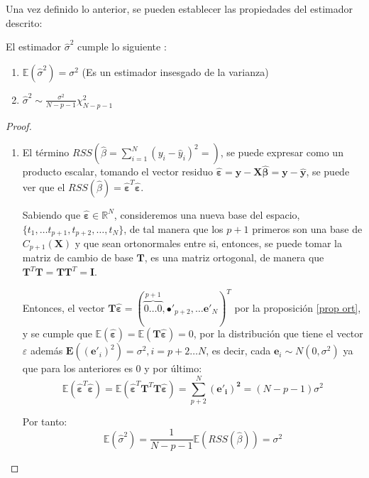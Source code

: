 \noindent Una vez definido lo anterior, se pueden establecer las propiedades del estimador descrito:
\begin{propo}
El estimador $\hat{\sigma}^2$ cumple lo siguiente :
\begin{enumerate}
\item $\mathbb{E}(\hat{\sigma} ^2)=\sigma^2$ (Es un estimador insesgado de la varianza)
\item  $\hat{\sigma}^2 \sim \frac{\sigma^2}{N-p-1}\chi_{N-p-1}^2 $
\end{enumerate}
\begin{proof}
\noindent 
\begin{enumerate}
\item El término $RSS(\hat{\beta}=\sum_{i=1}^N (y_i-\hat{y}_i)^2=)$, se puede expresar como un producto escalar, tomando el vector residuo $\hat{\mathbf{\varepsilon}}= \mathbf{y}-\mathbf{X \hat{\beta}}=\mathbf{y}-\mathbf{\hat{y}}$, se puede ver que el $RSS(\hat{\beta})=\hat{\mathbf{\varepsilon}}^T\hat{\mathbf{\varepsilon}}$. 

\noindent Sabiendo que $\mathbf{\hat{\varepsilon}}\in \mathbb{R}^N$, consideremos una nueva base del espacio,\\ $\lbrace t_1,\ldots t_{p+1},t_{p+2},\ldots, t_N \rbrace$, de tal manera que los $p+1$ primeros son una base de $C_{p+1}(\mathbf{X})$ y que sean ortonormales entre si, entonces, se puede tomar la matriz de cambio de base $\mathbf{T}$, es una matriz ortogonal, de manera que 
$\mathbf{T}^T\mathbf{T}=\mathbf{TT}^T=\mathbf{I}$. 

\noindent Entonces, el vector $\mathbf{T\hat{\varepsilon}}=(\overbrace{0\ldots 0}^{p+1},\mathbf{•}'_{p+2},\ldots \mathbf{e}'_{N})^T$ por la proposición \ref{prop ort}, y se cumple que $\mathbb{E}(\mathbf{\hat{\varepsilon}})=\mathbb{E}(\mathbf{T\hat{\varepsilon}})=0$, por la distribución que tiene el vector $\varepsilon$ además $\mathbf{E}((\mathbf{e}'_i)^2)=\sigma^2, i=p+2\ldots N $, es decir, cada $\mathbf{e}_i\sim N(0,\sigma^2)$ ya que para los anteriores es 0 y por último: 
\begin{equation}\label{eq:suma-residuos}
\mathbb{E}(\mathbf{\hat{\varepsilon}}^T\mathbf{\hat{\varepsilon}})=\mathbb{E}(\mathbf{\hat{\varepsilon}}^T\mathbf{T}^T\mathbf{T}\mathbf{\hat{\varepsilon}})=\sum_{p+2}^N \mathbf{(e'_i)^2}=(N-p-1) \sigma^2
\end{equation}

\noindent Por tanto:
\begin{equation}
\mathbb{E}(\hat{\sigma}^2)= \dfrac{1}{N-p-1}\mathbb{E}(RSS(\hat{\beta}))=\sigma^2
\end{equation}


\end{enumerate}
\end{proof}
\end{propo}
